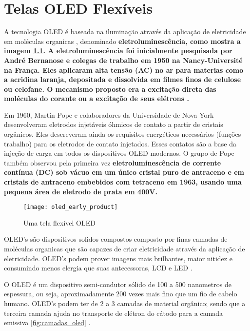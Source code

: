 \chapter{Telas OLED Flexíveis}
\label{cap:oled}

A tecnologia OLED é baseada na iluminação através da aplicação de eletricidade em moléculas organicas \cite{HSWOLED}, denominado \bf{eletroluminescência}, como mostra a imagem \ref{fig:oled_early_product}. A \bf{eletroluminescência} foi inicialmente pesquisada por André Bernanose e colegas de trabalho em 1950 na Nancy-Université na França. Eles aplicaram alta tensão (AC) no ar para materias como a \bf{acridina laranja}, depositada e dissolvida em filmes finos de celulose ou celofane. O mecanismo proposto era a excitação direta das moléculas do corante ou a excitação de seus elétrons \cite{WikipediaOLED}.

Em 1960, Martin Pope e colaboradores da Universidade de Nova York desenvolveram eletrodos injetáveis óhmicos de contato a partir de cristais orgânicos. Eles descreveram ainda os requisitos energéticos necessários (funções trabalho) para os eletrodos de contato injetados. Esses contatos são a base da injeção de carga em todos os dispositivos OLED modernos. O grupo de Pope também observou pela primeira vez \bf{eletroluminescência} de corrente contínua (DC) sob vácuo em um único cristal puro de antraceno e em cristais de antraceno embebidos com tetraceno em 1963, usando uma pequena área de eletrodo de prata em 400V. \cite{WikipediaOLED}

\begin{figure}[!h]
  \centering
  \texttt{[image: oled\_early\_product]} 
  \caption{Uma tela flexível OLED}
  \label{fig:oled_early_product} 
\end{figure}

OLED's são dispositivos solidos compostos composto por finas camadas de moléculas organicas que são capazes de criar eletricidade através da aplicação de eletricidade. OLED's podem prover imagens mais brilhantes, maior nitidez e consumindo menos elergia que suas antecessoras, LCD e LED \cite{HSWOLED}.

O OLED é um dispositivo semi-condutor sólido de 100 a 500 nanometros de espessura, ou seja, aproximadamente 200 vezes mais fino que um fio de cabelo humano. OLED's podem ter de 2 a 3 camadas de material orgânico; sendo que a terceira camada ajuda no transporte de elétron do cátodo para a camada emissiva \ref{fig:camadas_oled} \cite{HSWOLED}.

